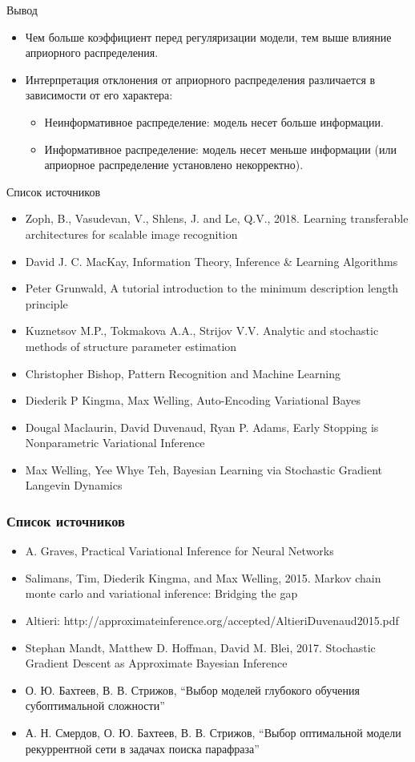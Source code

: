\documentclass[usenames,dvipsnames,10pt,pdf,utf8,russian,aspectratio=43]{beamer}
\begin{document}
\begin{frame}{Вывод}
\begin{itemize}
\item Чем больше коэффициент перед регуляризации модели, тем выше влияние априорного распределения.
\item Интерпретация отклонения от априорного распределения различается в зависимости от его характера:
\begin{itemize}
\item Неинформативное распределение: модель несет больше информации.
\item Информативное распределение: модель несет меньше информации (или априорное распределение установлено некорректно).
\end{itemize}
\end{itemize}
\end{frame}

\begin{frame}{Список источников}
\begin{itemize}
\item Zoph, B., Vasudevan, V., Shlens, J. and Le, Q.V., 2018. Learning transferable architectures for scalable image recognition
\item David J. C. MacKay, Information Theory, Inference \& Learning Algorithms
\item Peter Grunwald, A tutorial introduction to the minimum description length principle
\item Kuznetsov M.P., Tokmakova A.A., Strijov V.V. Analytic and stochastic methods of structure parameter estimation
\item Christopher Bishop, Pattern Recognition and Machine Learning
\item Diederik P Kingma, Max Welling, Auto-Encoding Variational Bayes
\item Dougal Maclaurin, David Duvenaud, Ryan P. Adams, Early Stopping is Nonparametric Variational Inference
\item Max Welling, Yee Whye Teh, Bayesian Learning via Stochastic Gradient Langevin Dynamics
\end{itemize}
\end{frame}

\begin{frame}
\frametitle{Список источников}
\begin{itemize}
\item A. Graves, Practical Variational Inference for Neural Networks
\item Salimans, Tim, Diederik Kingma, and Max Welling, 2015. Markov chain monte carlo and variational inference: Bridging the gap
\item Altieri: http://approximateinference.org/accepted/AltieriDuvenaud2015.pdf
\item Stephan Mandt, Matthew D. Hoffman, David M. Blei, 2017. Stochastic Gradient Descent as Approximate Bayesian Inference
\item О. Ю. Бахтеев, В. В. Стрижов, “Выбор моделей глубокого обучения субоптимальной сложности”
\item А. Н. Смердов, О. Ю. Бахтеев, В. В. Стрижов, “Выбор оптимальной модели рекуррентной сети в задачах поиска парафраза”
\end{itemize}
\end{frame}
\end{document}
